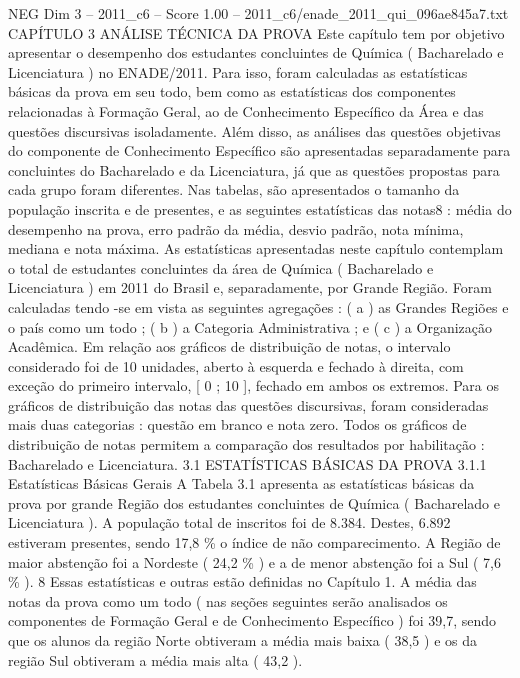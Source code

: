 \begin{textsample}{NEG Dim 3 – 2011\_c6 – Score 1.00 – 2011\_c6/enade\_2011\_qui\_096ae845a7.txt}  \label{ex:f3_neg_077}
CAPÍTULO 3 ANÁLISE TÉCNICA DA PROVA Este capítulo tem por objetivo apresentar o desempenho dos estudantes concluintes de Química ( Bacharelado e Licenciatura ) no ENADE/2011.
Para isso, foram calculadas as estatísticas básicas da prova em seu todo, bem como as estatísticas dos componentes relacionadas à Formação Geral, ao de Conhecimento Específico da Área e das questões discursivas isoladamente.
Além disso, as análises das questões objetivas do componente de Conhecimento Específico são apresentadas separadamente para concluintes do Bacharelado e da Licenciatura, já que as questões propostas para cada grupo foram diferentes.
Nas tabelas, são apresentados o tamanho da população inscrita e de presentes, e as seguintes estatísticas das notas8 : média do desempenho na prova, erro padrão da média, desvio padrão, nota mínima, mediana e nota máxima.
As estatísticas apresentadas neste capítulo contemplam o total de estudantes concluintes da área de Química ( Bacharelado e Licenciatura ) em 2011 do Brasil e, separadamente, por Grande Região.
Foram calculadas tendo -se em vista as seguintes agregações : ( a ) as Grandes Regiões e o país como um todo ; ( b ) a Categoria Administrativa ; e ( c ) a Organização Acadêmica.
Em relação aos gráficos de distribuição de notas, o intervalo considerado foi de 10 unidades, aberto à esquerda e fechado à direita, com exceção do primeiro intervalo, [ 0 ; 10 ], fechado em ambos os extremos.
Para os gráficos de distribuição das notas das questões discursivas, foram consideradas mais duas categorias : questão em branco e nota zero.
Todos os gráficos de distribuição de notas permitem a comparação dos resultados por habilitação : Bacharelado e Licenciatura. 3.1 ESTATÍSTICAS BÁSICAS DA PROVA 3.1.1 Estatísticas Básicas Gerais A Tabela 3.1 apresenta as estatísticas básicas da prova por grande Região dos estudantes concluintes de Química ( Bacharelado e Licenciatura ).
A população total de inscritos foi de 8.384.
Destes, 6.892 estiveram presentes, sendo 17,8 \% o índice de não comparecimento.
A Região de maior abstenção foi a Nordeste ( 24,2 \% ) e a de menor abstenção foi a Sul ( 7,6 \% ). 8 Essas estatísticas e outras estão definidas no Capítulo 1.
A média das notas da prova como um todo ( nas seções seguintes serão analisados os componentes de Formação Geral e de Conhecimento Específico ) foi 39,7, sendo que os alunos da região Norte obtiveram a média mais baixa ( 38,5 ) e os da região Sul obtiveram a média mais alta ( 43,2 ).

\end{textsample}
